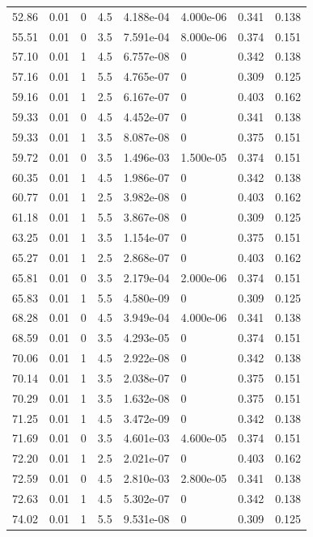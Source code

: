 \documentclass[preview]{standalone}
\begin{document}
{{{\begin{tabular}{L{1.2cm}C{1.2cm} C{0.3cm}C{0.5cm} C{1.4cm}C{1.4cm} C{1.4cm}C{1.4cm}}
  52.86  &  0.01  & 0     & 4.5 &  4.188e-04  & 4.000e-06  & 0.341 &  0.138   \\ 
  55.51  &  0.01  & 0     & 3.5 &  7.591e-04  & 8.000e-06  & 0.374 &  0.151   \\ 
  57.10  &  0.01  & 1     & 4.5 &  6.757e-08  & 0  & 0.342 &  0.138   \\ 
  57.16  &  0.01  & 1     & 5.5 &  4.765e-07  & 0  & 0.309 &  0.125   \\ 
  59.16  &  0.01  & 1     & 2.5 &  6.167e-07  & 0  & 0.403 &  0.162   \\ 
  59.33  &  0.01  & 0     & 4.5 &  4.452e-07  & 0  & 0.341 &  0.138   \\ 
  59.33  &  0.01  & 1     & 3.5 &  8.087e-08  & 0  & 0.375 &  0.151   \\ 
  59.72  &  0.01  & 0     & 3.5 &  1.496e-03  & 1.500e-05  & 0.374 &  0.151   \\ 
  60.35  &  0.01  & 1     & 4.5 &  1.986e-07  & 0  & 0.342 &  0.138   \\ 
  60.77  &  0.01  & 1     & 2.5 &  3.982e-08  & 0  & 0.403 &  0.162   \\ 
  61.18  &  0.01  & 1     & 5.5 &  3.867e-08  & 0  & 0.309 &  0.125   \\ 
  63.25  &  0.01  & 1     & 3.5 &  1.154e-07  & 0  & 0.375 &  0.151   \\ 
  65.27  &  0.01  & 1     & 2.5 &  2.868e-07  & 0  & 0.403 &  0.162   \\ 
  65.81  &  0.01  & 0     & 3.5 &  2.179e-04  & 2.000e-06  & 0.374 &  0.151   \\ 
  65.83  &  0.01  & 1     & 5.5 &  4.580e-09  & 0  & 0.309 &  0.125   \\ 
  68.28  &  0.01  & 0     & 4.5 &  3.949e-04  & 4.000e-06  & 0.341 &  0.138   \\ 
  68.59  &  0.01  & 0     & 3.5 &  4.293e-05  & 0  & 0.374 &  0.151   \\ 
  70.06  &  0.01  & 1     & 4.5 &  2.922e-08  & 0  & 0.342 &  0.138   \\ 
  70.14  &  0.01  & 1     & 3.5 &  2.038e-07  & 0  & 0.375 &  0.151   \\ 
  70.29  &  0.01  & 1     & 3.5 &  1.632e-08  & 0  & 0.375 &  0.151   \\ 
  71.25  &  0.01  & 1     & 4.5 &  3.472e-09  & 0  & 0.342 &  0.138   \\ 
  71.69  &  0.01  & 0     & 3.5 &  4.601e-03  & 4.600e-05  & 0.374 &  0.151   \\ 
  72.20  &  0.01  & 1     & 2.5 &  2.021e-07  & 0  & 0.403 &  0.162   \\ 
  72.59  &  0.01  & 0     & 4.5 &  2.810e-03  & 2.800e-05  & 0.341 &  0.138   \\ 
  72.63  &  0.01  & 1     & 4.5 &  5.302e-07  & 0  & 0.342 &  0.138   \\ 
  74.02  &  0.01  & 1     & 5.5 &  9.531e-08  & 0  & 0.309 &  0.125   \\ 
\hline 
\end{tabular} 

}}}
\end{document}
